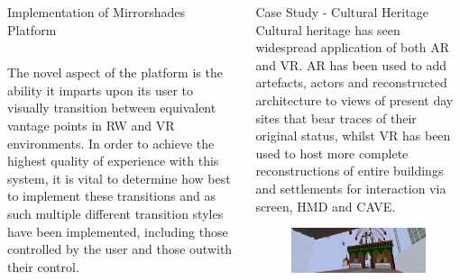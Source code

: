 \documentclass[final,t]{beamer}
\begin{document}
\begin{frame}
\begin{columns}[t]
\begin{column}{.31\linewidth}
\begin{block}{Implementation of Mirrorshades Platform}
\begin{columns}
				\begin{column}{.45\linewidth}
					The novel aspect of the platform is the ability it imparts upon its user to visually transition between equivalent vantage points in RW and VR environments. In order to achieve the highest quality of experience with this system, it is vital to determine how best to implement these transitions and as such multiple different transition styles have been implemented, including those controlled by the user and those outwith their control.
					
				\end{column}
			\end{columns}
			
			
		\end{block}
				
    \end{column}
    
    
    \begin{column}{.31\linewidth}
    
    	\begin{block}{Case Study - Cultural Heritage}
    		Cultural heritage has seen widespread application of both AR and VR. AR has been used to add artefacts, actors and reconstructed architecture to views of present day sites that bear traces of their original status, whilst VR has been used to host more complete reconstructions of entire buildings and settlements for interaction via screen, HMD and CAVE.

    		\begin{figure}[h]
				\begin{center}
					\includegraphics[width=\linewidth]{images/sallies_colour.png}
					

\end{center}
\end{figure}
\end{block}
\end{column}
\end{columns}
\end{frame}
\end{document}

